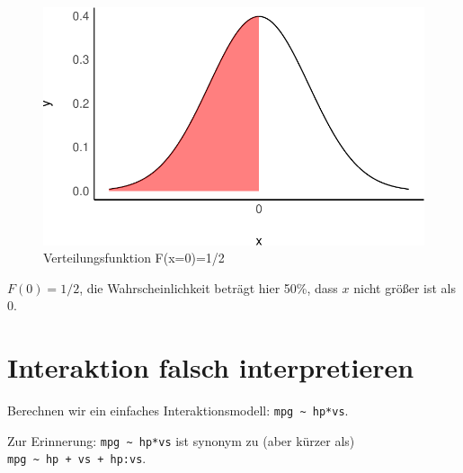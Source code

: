 \documentclass[
  a4paper,
  DIV=11]{scrreprt}
\theoremstyle{definition}
\theoremstyle{remark}
\begin{document}
\begin{figure}

{\centering \includegraphics{./abschluss_files/figure-pdf/fig-F-1.pdf}

}

\caption{\label{fig-F}Verteilungsfunktion F(x=0)=1/2}

\end{figure}

\(F(0)=1/2\), die Wahrscheinlichkeit beträgt hier 50\%, dass \(x\) nicht
größer ist als 0.

\hypertarget{interaktion-falsch-interpretieren}{%
\section{Interaktion falsch interpretieren
🤷}\label{interaktion-falsch-interpretieren}}

Berechnen wir ein einfaches Interaktionsmodell:
\texttt{mpg\ \textasciitilde{}\ hp*vs}.

\begin{tcolorbox}[enhanced jigsaw, title=\textcolor{quarto-callout-note-color}{\faInfo}\hspace{0.5em}{Hinweis}, bottomtitle=1mm, bottomrule=.15mm, titlerule=0mm, colbacktitle=quarto-callout-note-color!10!white, colframe=quarto-callout-note-color-frame, leftrule=.75mm, left=2mm, toprule=.15mm, colback=white, arc=.35mm, breakable, toptitle=1mm, opacityback=0, rightrule=.15mm, coltitle=black, opacitybacktitle=0.6]

Zur Erinnerung: \texttt{mpg\ \textasciitilde{}\ hp*vs} ist synonym zu
(aber kürzer als) \texttt{mpg\ \textasciitilde{}\ hp\ +\ vs\ +\ hp:vs}.

\end{tcolorbox}
\end{document}
